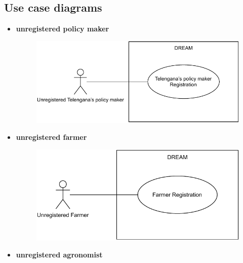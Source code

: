 \documentclass[../../main.tex]{subfiles}
\begin{document}
\subsection{Use case diagrams}
\begin{itemize}
    

    \item \textbf{unregistered policy maker}
    
      \begin{figure}[H]
        \centering
        \includegraphics[width=\textwidth]{RASD/image/Use_Cases2_policy_maker.pdf}
      \end{figure}
      
      
      
    \item \textbf{unregistered farmer}
    
      \begin{figure}[H]
        \centering
        \includegraphics[width=\textwidth]{RASD/image/Use_Cases_farmer.pdf}
      \end{figure}
      
      
      
    \item \textbf{unregistered agronomist}
    

\end{itemize}
\end{document}
